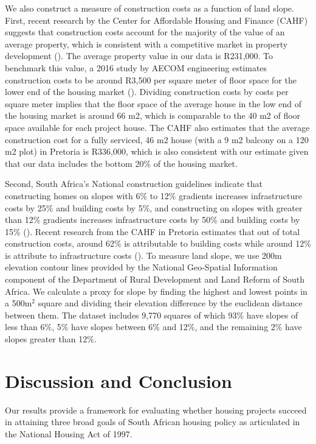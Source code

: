 \documentclass[12pt]{article}
\begin{document}
We also construct a measure of construction costs as a function of land slope.  First, recent research by the Center for Affordable Housing and Finance (CAHF) suggests that construction costs account for the majority of the value of an average property, which is consistent with a competitive market in property development (\cite{cahfcosts}).  The average property value in our data is R231,000.  To benchmark this value, a 2016 study by AECOM engineering estimates construction costs to be around R3,500 per square meter of floor space for the lower end of the housing market (\cite{aecom}).  Dividing construction costs by costs per square meter implies that the floor space of the average house in the low end of the housing market is around 66 m2, which is comparable to the 40 m2 of floor space available for each project house.  The CAHF also estimates that the average construction cost for a fully serviced, 46 m2 house (with a 9 m2 balcony on a 120 m2 plot) in Pretoria is R336,000, which is also consistent with our estimate given that our data includes the bottom 20\% of the housing market.

Second, South Africa's National construction guidelines indicate that constructing homes on slopes with 6\% to 12\% gradients increases infrastructure costs by 25\% and building costs by 5\%, and constructing on slopes with greater than 12\% gradients increases infrastructure costs by 50\% and building costs by 15\% (\cite{redbook}).  Recent research from the CAHF in Pretoria estimates that out of total construction costs, around 62\% is attributable to building costs while around 12\% is attribute to infrastructure costs (\cite{cahfcosts}).  To measure land slope, we use 200m elevation contour lines provided by the National Geo-Spatial Information component of the Department of Rural Development and Land Reform of South Africa.  We calculate a proxy for slope by finding the highest and lowest points in a 500$\text{m}^{2}$ square and dividing their elevation difference by the euclidean distance between them.  The dataset includes 9,770 squares of which 93\% have slopes of less than 6\%, 5\% have slopes between 6\% and 12\%, and the remaining 2\% have slopes greater than 12\%.


\section{Discussion and Conclusion}\label{section:discussion}


Our results provide a framework for evaluating whether housing projects succeed in attaining three broad goals of South African housing policy as articulated in the National Housing Act of 1997.
\end{document}
